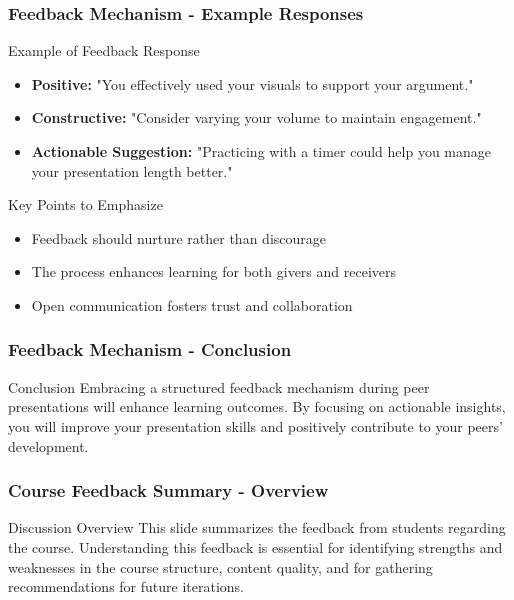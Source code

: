 \documentclass[aspectratio=169]{beamer}
\begin{document}
\begin{frame}[fragile]
    \frametitle{Feedback Mechanism - Example Responses}
    \begin{block}{Example of Feedback Response}
        \begin{itemize}
            \item \textbf{Positive:} "You effectively used your visuals to support your argument."
            \item \textbf{Constructive:} "Consider varying your volume to maintain engagement."
            \item \textbf{Actionable Suggestion:} "Practicing with a timer could help you manage your presentation length better."
        \end{itemize}
    \end{block}

    \begin{block}{Key Points to Emphasize}
        \begin{itemize}
            \item Feedback should nurture rather than discourage
            \item The process enhances learning for both givers and receivers
            \item Open communication fosters trust and collaboration
        \end{itemize}
    \end{block}
\end{frame}

\begin{frame}[fragile]
    \frametitle{Feedback Mechanism - Conclusion}
    \begin{block}{Conclusion}
        Embracing a structured feedback mechanism during peer presentations will enhance learning outcomes.
        By focusing on actionable insights, you will improve your presentation skills and positively contribute to your peers' development.
    \end{block}
\end{frame}

\begin{frame}[fragile]
    \frametitle{Course Feedback Summary - Overview}
    \begin{block}{Discussion Overview}
        This slide summarizes the feedback from students regarding the course. 
        Understanding this feedback is essential for identifying 
        strengths and weaknesses in the course structure, content quality, 
        and for gathering recommendations for future iterations.
    \end{block}
\end{frame}
\end{document}
